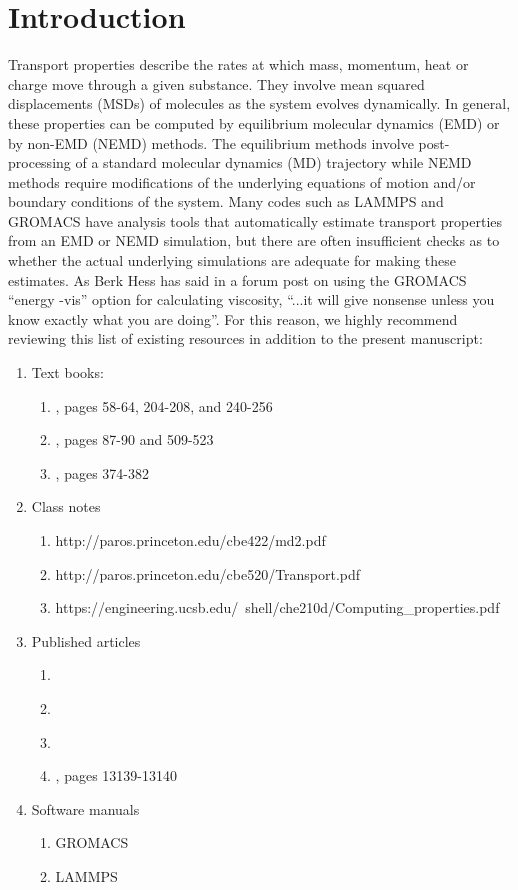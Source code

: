\documentclass[9pt]{livecoms}
\begin{document}
\section{Introduction}

Transport properties describe the rates at which mass, momentum, heat or charge move through a given substance. They involve mean squared displacements (MSDs) of molecules as the system evolves dynamically. In general, these properties can be computed by equilibrium molecular dynamics (EMD) or by non-EMD (NEMD) methods. The equilibrium methods involve post-processing of a standard molecular dynamics (MD) trajectory while NEMD methods require modifications of the underlying equations of motion and/or boundary conditions of the system. Many codes such as LAMMPS and GROMACS have analysis tools that automatically estimate transport properties from an EMD or NEMD simulation, but there are often insufficient checks as to whether the actual underlying simulations are adequate for making these estimates. As Berk Hess has said in a forum post on using the GROMACS ``energy -vis'' option for calculating viscosity, ``...it will give nonsense unless you know exactly what you are doing''. For this reason, we highly recommend reviewing this list of existing resources in addition to the present manuscript:
\begin{enumerate}
	\item Text books:
	\begin{enumerate}
		\item \cite{Allen1987}, pages 58-64, 204-208, and 240-256
		\item \cite{Frenkel2002}, pages 87-90 and 509-523
		\item \cite{Leach2001}, pages 374-382
	\end{enumerate}
	\item Class notes
	\begin{enumerate}
		\item http://paros.princeton.edu/cbe422/md2.pdf
		\item http://paros.princeton.edu/cbe520/Transport.pdf
		\item https://engineering.ucsb.edu/~shell/che210d/Computing\_properties.pdf
	\end{enumerate}
	\item Published articles
	\begin{enumerate}
		\item \cite{Hess2002}
		\item \cite{Chen2009}
		\item \cite{Ungerer2007}
		\item \cite{Nieto2015}, pages 13139-13140
	\end{enumerate}
	\item Software manuals
	\begin{enumerate}
		\item GROMACS
		\item LAMMPS
	\end{enumerate}
\end{enumerate}
\end{document}
